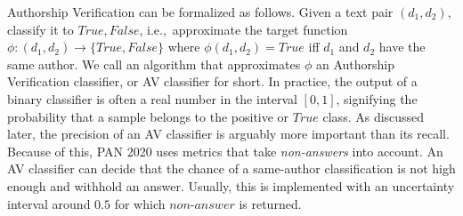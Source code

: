 Authorship Verification can be formalized as follows.
Given a text pair $(d_1, d_2)$, classify it to ${True, False}$, i.e.,\ approximate the target function $\phi{}:(d_1, d_2)\to\{True, False\}$ where $\phi(d_1, d_2)=True$ iff $d_1$ and $d_2$ have the same author.
We call an algorithm that approximates $\phi$ an Authorship Verification classifier, or AV classifier for short.
In practice, the output of a binary classifier is often a real number in the interval $[0,1]$, signifying the probability that a sample belongs to the positive or $True$ class.
As discussed later, the precision of an AV classifier is arguably more important than its recall.
Because of this, PAN 2020 uses metrics that take \textit{non-answers} into account.
An AV classifier can decide that the chance of a same-author classification is not high enough and withhold an answer.
Usually, this is implemented with an uncertainty interval around $0.5$ for which $non\text{-}answer$ is returned.


